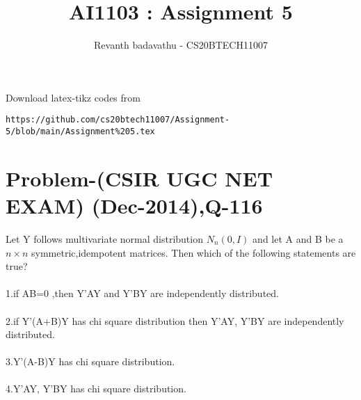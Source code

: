 \documentclass[journal,12pt,twocolumn]{IEEEtran}
\begin{document}
\let\vec\mathbf
\renewcommand{\thefigure}{\theproblem}
\def\putbox#1#2#3{\makebox[0in][l]{\makebox[#1][l]{}\raisebox{\baselineskip}[0in][0in]{\raisebox{#2}[0in][0in]{#3}}}}
     \def\rightbox#1{\makebox[0in][r]{#1}}
     \def\centbox#1{\makebox[0in]{#1}}
     \def\topbox#1{\raisebox{-\baselineskip}[0in][0in]{#1}}
     \def\midbox#1{\raisebox{-0.5\baselineskip}[0in][0in]{#1}}
\vspace{3cm}
\title{AI1103 : Assignment 5}
\author{Revanth badavathu - CS20BTECH11007}
\maketitle
\newpage
\bigskip
\renewcommand{\thefigure}{\arabic{figure}}
\renewcommand{\thetable}{\arabic{table}}

 Download latex-tikz codes from 
%
\begin{lstlisting}
https://github.com/cs20btech11007/Assignment-5/blob/main/Assignment%205.tex
\end{lstlisting}
\section*{\textbf{Problem-(CSIR UGC NET EXAM) (Dec-2014),Q-116}}
Let Y follows multivariate normal distribution $N_{n}(0,I)$ and let A and B be a $n\times n$ symmetric,idempotent matrices. Then which of the following statements are true? \\
\\1.if AB=0 ,then Y'AY and Y'BY are independently distributed.\\
\\2.if Y'(A+B)Y has chi square distribution then Y'AY, Y'BY are independently distributed.\\
\\3.Y'(A-B)Y has chi square distribution.\\
\\4.Y'AY, Y'BY has chi square distribution.\\
\end{document}
